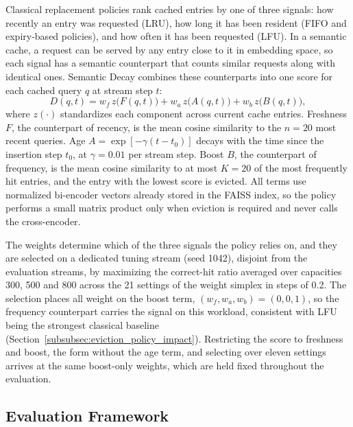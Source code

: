 \documentclass[authoryear,preprint,review,12pt]{elsarticle}
\begin{document}
Classical replacement policies rank cached entries by one of three signals: how recently an entry was requested (LRU), how long it has been resident (FIFO and expiry-based policies), and how often it has been requested (LFU). In a semantic cache, a request can be served by any entry close to it in embedding space, so each signal has a semantic counterpart that counts similar requests along with identical ones. Semantic Decay combines these counterparts into one score for each cached query $q$ at stream step $t$:
\begin{equation}
D(q,t)=w_f\,z\bigl(F(q,t)\bigr)+w_a\,z\bigl(A(q,t)\bigr)+w_b\,z\bigl(B(q,t)\bigr),
\end{equation}
where $z(\cdot)$ standardizes each component across current cache entries. Freshness $F$, the counterpart of recency, is the mean cosine similarity to the $n=20$ most recent queries. Age $A=\exp[-\gamma(t-t_0)]$ decays with the time since the insertion step $t_0$, at $\gamma=0.01$ per stream step. Boost $B$, the counterpart of frequency, is the mean cosine similarity to at most $K=20$ of the most frequently hit entries, and the entry with the lowest score is evicted. All terms use normalized bi-encoder vectors already stored in the FAISS index, so the policy performs a small matrix product only when eviction is required and never calls the cross-encoder.

The weights determine which of the three signals the policy relies on, and they are selected on a dedicated tuning stream (seed 1042), disjoint from the evaluation streams, by maximizing the correct-hit ratio averaged over capacities 300, 500 and 800 across the 21 settings of the weight simplex in steps of 0.2. The selection places all weight on the boost term, $(w_f,w_a,w_b)=(0,0,1)$, so the frequency counterpart carries the signal on this workload, consistent with LFU being the strongest classical baseline (Section~\ref{subsubsec:eviction_policy_impact}). Restricting the score to freshness and boost, the form without the age term, and selecting over eleven settings arrives at the same boost-only weights, which are held fixed throughout the evaluation.

\subsection{Evaluation Framework}
\label{subsec:evaluation_setup}
\end{document}
